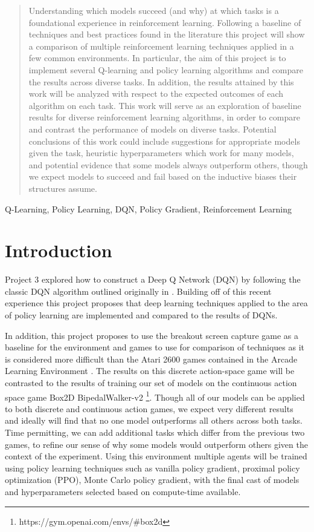 \documentclass[conference]{IEEEtran}
\begin{document}
\begin{abstract}
    Understanding which models succeed (and why) at which tasks is a foundational experience in reinforcement learning.
    Following a baseline of techniques and best practices found in the literature this project will show a comparison of multiple reinforcement learning techniques applied in a few common environments.
    In particular, the aim of this project is to implement several Q-learning and policy learning algorithms and compare the results across diverse tasks.
    In addition, the results attained by this work will be analyzed with respect to the expected outcomes of each algorithm on each task.
    This work will serve as an exploration of baseline results for diverse reinforcement learning algorithms, in order to compare and contrast the performance of models on diverse tasks.
    Potential conclusions of this work could include suggestions for appropriate models given the task, heuristic hyperparameters which work for many models, and potential evidence that some models always outperform others, though we expect models to succeed and fail based on the inductive biases their structures assume.
\end{abstract}

\begin{IEEEkeywords}
Q-Learning, Policy Learning, DQN, Policy Gradient, Reinforcement Learning
\end{IEEEkeywords}

\section{Introduction}
Project 3 explored how to construct a Deep Q Network (DQN) by following the classic DQN algorithm outlined originally in \cite{DQNOriginalPaper}.
Building off of this recent experience this project proposes that deep learning techniques applied to the area of policy learning are implemented and compared to the results of DQNs.

In addition, this project proposes to use the \cite{DQNOriginalPaper} breakout screen capture game as a baseline for the environment and games to use for comparison of techniques as it is considered more difficult than the Atari 2600 games contained in the Arcade Learning Environment \cite{Bellemare_2013}. The results on this discrete action-space game will be contrasted to the results of training our set of models on the continuous action space game Box2D BipedalWalker-v2 \footnote{https://gym.openai.com/envs/\#box2d}. Though all of our models can be applied to both discrete and continuous action games, we expect very different results and ideally will find that no one model outperforms all others across both tasks. Time permitting, we can add additional tasks which differ from the previous two games, to refine our sense of why some models would outperform others given the context of the experiment.
Using this environment multiple agents will be trained using policy learning techniques such as vanilla policy gradient, proximal policy optimization (PPO), Monte Carlo policy gradient, with the final cast of models and hyperparameters selected based on compute-time available.
\end{document}
